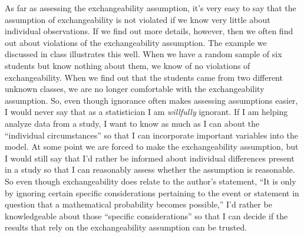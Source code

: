 \documentclass[11pt]{article}\usepackage[]{graphicx}\usepackage[]{color}
\begin{document}
\begin{doublespacing}
\begin{enumerate}
As far as assessing the exchangeability assumption, it's very easy to say that the assumption of exchangeability is not violated if we know very little about individual observations. If we find out more details, however, then we often find out about violations of the exchangeability assumption. The example we discussed in class illustrates this well. When we have a random sample of six students but know nothing about them, we know of no violations of exchangeability. When we find out that the students came from two different unknown classes, we are no longer comfortable with the exchangeability assumption. So, even though ignorance often makes assessing assumptions easier, I would never say that as a statistician I am {\it willfully} ignorant. If I am helping analyze data from a study, I want to know as much as I can about the ``individual circumstances'' so that I can incorporate important variables into the model. At some point we are forced to make the exchangeability assumption, but I would still say that I'd rather be informed about individual differences present in a study so that I can reasonably assess whether the assumption is reasonable. So even though exchangeability does relate to the author's statement, ``It is only by ignoring certain specific considerations pertaining to the event or statement in question that a mathematical probability becomes possible,'' I'd rather be knowledgeable about those ``specific considerations'' so that I can decide if the results that rely on the exchangeability assumption can be trusted. 














\end{enumerate}
\end{doublespacing}
\end{document}
